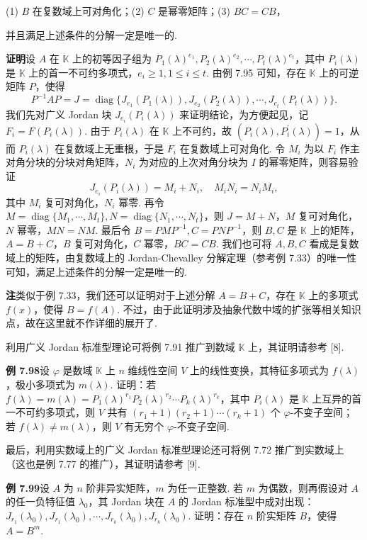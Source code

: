\documentclass[UTF8,12pt,a4paper,fontset=fandol]{ctexart}
\begin{document}
(1) $B$ 在复数域上可对角化；\quad (2) $C$ 是幂零矩阵；\quad (3) $BC=CB$，

并且满足上述条件的分解一定是唯一的.

\noindent\textbf{证明}\quad 设 $A$ 在 $\mathbb{K}$ 上的初等因子组为 $P_1(\lambda)^{e_1},P_2(\lambda)^{e_2},\cdots,P_t(\lambda)^{e_t}$，其中 $P_i(\lambda)$ 是 $\mathbb{K}$ 上的首一不可约多项式，$e_i\ge1,1\le i\le t$. 由例 7.95 可知，存在 $\mathbb{K}$ 上的可逆矩阵 $P$，使得
\[
P^{-1}AP=J=\operatorname{diag}\{J_{e_1}(P_1(\lambda)),J_{e_2}(P_2(\lambda)),\cdots,J_{e_t}(P_t(\lambda))\}.
\]
我们先对广义 Jordan 块 $J_{e_i}(P_i(\lambda))$ 来证明结论，为方便起见，记 $F_i=F(P_i(\lambda))$. 由于 $P_i(\lambda)$ 在 $\mathbb{K}$ 上不可约，故 $(P_i(\lambda),P_i^{\prime}(\lambda))=1$，从而 $P_i(\lambda)$ 在复数域上无重根，于是 $F_i$ 在复数域上可对角化. 令 $M_i$ 为以 $F_i$ 作主对角分块的分块对角矩阵，$N_i$ 为对应的上次对角分块为 $I$ 的幂零矩阵，则容易验证
\[
J_{e_i}(P_i(\lambda))=M_i+N_i,\quad M_iN_i=N_iM_i,
\]
其中 $M_i$ 复可对角化，$N_i$ 幂零. 再令 $M=\operatorname{diag}\{M_1,\cdots,M_t\},N=\operatorname{diag}\{N_1,\cdots,N_t\}$，则 $J=M+N$，$M$ 复可对角化，$N$ 幂零，$MN=NM$. 最后令 $B=PMP^{-1},C=PNP^{-1}$，则 $B,C$ 是 $\mathbb{K}$ 上的矩阵，$A=B+C$，$B$ 复可对角化，$C$ 幂零，$BC=CB$. 我们也可将 $A,B,C$ 看成是复数域上的矩阵，由复数域上的 Jordan-Chevalley 分解定理（参考例 7.33）的唯一性可知，满足上述条件的分解一定是唯一的.

\noindent\textbf{注}\quad 类似于例 7.33，我们还可以证明对于上述分解 $A=B+C$，存在 $\mathbb{K}$ 上的多项式 $f(x)$，使得 $B=f(A)$. 不过，由于此证明涉及抽象代数中域的扩张等相关知识点，故在这里就不作详细的展开了.

利用广义 Jordan 标准型理论可将例 7.91 推广到数域 $\mathbb{K}$ 上，其证明请参考 [8].

\noindent\textbf{例 7.98}\quad 设 $\varphi$ 是数域 $\mathbb{K}$ 上 $n$ 维线性空间 $V$ 上的线性变换，其特征多项式为 $f(\lambda)$，极小多项式为 $m(\lambda)$. 证明：若 $f(\lambda)=m(\lambda)=P_1(\lambda)^{r_1}P_2(\lambda)^{r_2}\cdots P_k(\lambda)^{r_k}$，其中 $P_i(\lambda)$ 是 $\mathbb{K}$ 上互异的首一不可约多项式，则 $V$ 共有 $(r_1+1)(r_2+1)\cdots(r_k+1)$ 个 $\varphi$-不变子空间；若 $f(\lambda)\ne m(\lambda)$，则 $V$ 有无穷个 $\varphi$-不变子空间.

最后，利用实数域上的广义 Jordan 标准型理论还可将例 7.72 推广到实数域上（这也是例 7.77 的推广），其证明请参考 [9].

\noindent\textbf{例 7.99}\quad 设 $A$ 为 $n$ 阶非异实矩阵，$m$ 为任一正整数. 若 $m$ 为偶数，则再假设对 $A$ 的任一负特征值 $\lambda_0$，其 Jordan 块在 $A$ 的 Jordan 标准型中成对出现：$J_{r_1}(\lambda_0),J_{r_1}(\lambda_0),\cdots,J_{r_k}(\lambda_0),J_{r_k}(\lambda_0)$. 证明：存在 $n$ 阶实矩阵 $B$，使得 $A=B^m$.
\end{document}

